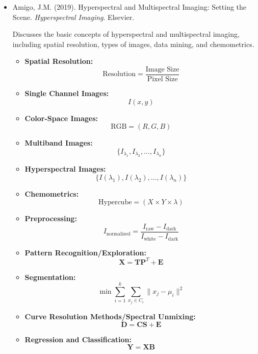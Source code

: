 \documentclass[10pt,svgnames,fragile]{beamer}
\begin{document}
\begin{frame}
\tiny
\begin{itemize}

\item Amigo, J.M. (2019). Hyperspectral and Multispectral Imaging: Setting the Scene. \textit{Hyperspectral Imaging}. Elsevier. \href{https://doi.org/10.1016/B978-0-444-63977-6.00001-8}{\color{blue}{DOI: 10.1016/B978-0-444-63977-6.00001-8}}
\cite{amigoHyperspectralMultispectralImaging2019}

{\color{gray}Discusses the basic concepts of hyperspectral and multispectral imaging, including spatial resolution, types of images, data mining, and chemometrics.}
\begin{itemize} \tiny
    \item \textbf{Spatial Resolution:}
    \[
    \text{Resolution} = \frac{\text{Image Size}}{\text{Pixel Size}}
    \]
    \item \textbf{Single Channel Images:}
    \[
    I(x, y)
    \]
    \item \textbf{Color-Space Images:}
    \[
    \text{RGB} = (R, G, B)
    \]
    \item \textbf{Multiband Images:}
    \[
    \{I_{\lambda_1}, I_{\lambda_2}, \ldots, I_{\lambda_n}\}
    \]
    \item \textbf{Hyperspectral Images:}
    \[
    \{I(\lambda_1), I(\lambda_2), \ldots, I(\lambda_n)\}
    \]
    \item \textbf{Chemometrics:}
    \[
    \text{Hypercube} = (X \times Y \times \lambda)
    \]
    \item \textbf{Preprocessing:}
    \[
    I_{\text{normalized}} = \frac{I_{\text{raw}} - I_{\text{dark}}}{I_{\text{white}} - I_{\text{dark}}}
    \]
    \item \textbf{Pattern Recognition/Exploration:}
    \[
    \mathbf{X} = \mathbf{T} \mathbf{P}^T + \mathbf{E}
    \]
    \item \textbf{Segmentation:}
    \[
    \min \sum_{i=1}^{k} \sum_{x_j \in C_i} \|x_j - \mu_i\|^2
    \]
    \item \textbf{Curve Resolution Methods/Spectral Unmixing:}
    \[
    \mathbf{D} = \mathbf{C} \mathbf{S} + \mathbf{E}
    \]
    \item \textbf{Regression and Classification:}
    \[
    \mathbf{Y} = \mathbf{X} \mathbf{B}
    \]
\end{itemize}

\end{itemize}
\end{frame}
\end{document}
